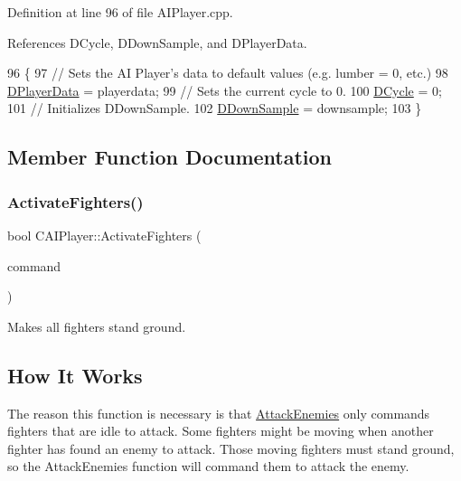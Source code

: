 Definition at line 96 of file A\+I\+Player.\+cpp.



References D\+Cycle, D\+Down\+Sample, and D\+Player\+Data.


\begin{DoxyCode}
96                                                                            \{
97     \textcolor{comment}{// Sets the AI Player's data to default values (e.g. lumber = 0, etc.)}
98     \hyperlink{classCAIPlayer_a83b5113c8f7e80df54940b647c5ee2e6}{DPlayerData} = playerdata;
99     \textcolor{comment}{// Sets the current cycle to 0.}
100     \hyperlink{classCAIPlayer_adf12a7afe7ea86410b18eff47fa95253}{DCycle} = 0;
101     \textcolor{comment}{// Initializes DDownSample.}
102     \hyperlink{classCAIPlayer_a091aed92cb9ad1a789900a6394d2f352}{DDownSample} = downsample;
103 \}
\end{DoxyCode}


\subsection{Member Function Documentation}
\hypertarget{classCAIPlayer_a4216d7e76315234a4fe22fb3a0a89c1d}{}\label{classCAIPlayer_a4216d7e76315234a4fe22fb3a0a89c1d} 
\subsubsection{\texorpdfstring{Activate\+Fighters()}{ActivateFighters()}}
{\footnotesize\ttfamily bool C\+A\+I\+Player\+::\+Activate\+Fighters (\begin{DoxyParamCaption}\item[{\hyperlink{structSPlayerCommandRequest}{S\+Player\+Command\+Request} \&}]{command }\end{DoxyParamCaption})\hspace{0.3cm}{\ttfamily [protected]}}



Makes all fighters stand ground. 

\hypertarget{classCAIPlayer_afhow_sec}{}\subsection{How It Works}\label{classCAIPlayer_afhow_sec}
The reason this function is necessary is that \hyperlink{classCAIPlayer_adf7feeba7debf9f19b000887616d7bfb}{Attack\+Enemies} only commands fighters that are idle to attack. Some fighters might be moving when another fighter has found an enemy to attack. Those moving fighters must stand ground, so the Attack\+Enemies function will command them to attack the enemy.

